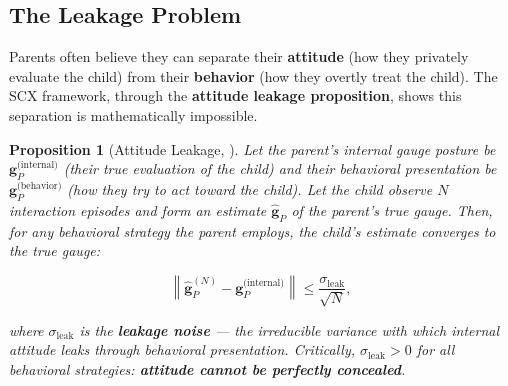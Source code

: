 \documentclass[11pt,a4paper]{article}
\newtheorem{proposition}[theorem]{Proposition}
\newcommand{\norm}[1]{\left\lVert#1\right\rVert}
\begin{document}
\subsection{The Leakage Problem}

Parents often believe they can separate their \textbf{attitude} (how they privately evaluate the child) from their \textbf{behavior} (how they overtly treat the child). The SCX framework, through the \textbf{attitude leakage proposition}, shows this separation is mathematically impossible.

\begin{proposition}[Attitude Leakage, \textbf{}]
\label{prop:attitude_leakage}
Let the parent's internal gauge posture be $\mathbf{g}_P^{\text{(internal)}}$ (their true evaluation of the child) and their behavioral presentation be $\mathbf{g}_P^{\text{(behavior)}}$ (how they try to act toward the child). Let the child observe $N$ interaction episodes and form an estimate $\hat{\mathbf{g}}_P$ of the parent's true gauge. Then, for any behavioral strategy the parent employs, the child's estimate converges to the true gauge:

\begin{equation}
    \norm{\hat{\mathbf{g}}_P^{(N)} - \mathbf{g}_P^{\text{(internal)}}} \leq \frac{\sigma_{\text{leak}}}{\sqrt{N}},
    \label{eq:leakage_bound}
\end{equation}

where $\sigma_{\text{leak}}$ is the \textbf{leakage noise} — the irreducible variance with which internal attitude leaks through behavioral presentation. Critically, $\sigma_{\text{leak}} > 0$ for all behavioral strategies: \textbf{attitude cannot be perfectly concealed}.
\end{proposition}
\end{document}
